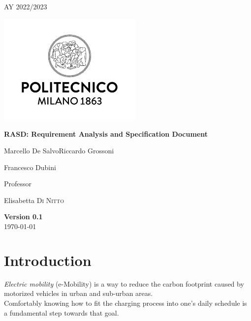 \documentclass[table, 12pt]{article} %
\begin{document}
    
    \begin{titlepage}
        \centering
        {\scshape\large AY 2022/2023 \par}
        \vfill
        \includegraphics[width=200pt]{assets/logo_polimi}\par\vspace{1cm}
        \vspace{0.5cm}
        {\huge\bfseries RASD\@: Requirement Analysis
            and Specification Document \par}
        \vspace{1cm}
        {\large {Marcello De Salvo\quad Riccardo Grossoni \par Francesco Dubini}\par}
        \vfill
        {\large Professor\par
            Elisabetta \textsc{Di Nitto}}
        \vfill
        {\large \textbf{Version 0.1}\\ \today \par}
    \end{titlepage}
    
    \thispagestyle{plain}

    \mbox{}

    \newpage
    \tableofcontents

    \newpage

    \section{Introduction}
        \emph{Electric mobility} (e-Mobility) is a way to reduce the carbon footprint caused by motorized vehicles in urban and sub-urban areas.\\
        Comfortably knowing how to fit the charging process into one's daily schedule is a fundamental step towards that goal.
        
\end{document}
